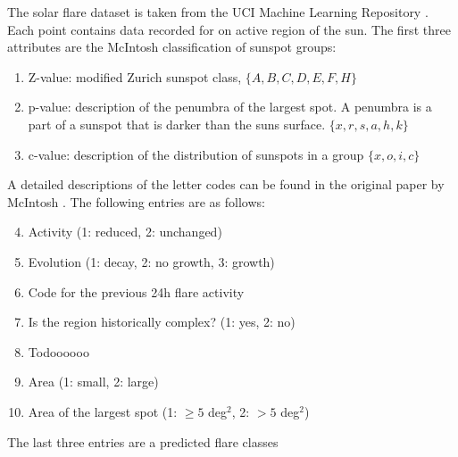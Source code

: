 The solar flare dataset is taken from the UCI Machine Learning Repository \cite{Dua2019}. Each point contains data recorded for on active region of the sun.
The first three attributes are the McIntosh classification of sunspot groups:
\begin{enumerate}
    \item Z-value: modified Zurich sunspot class, $\{A, B, C, D, E, F, H\}$
    \item p-value: description of the penumbra of the largest spot. A penumbra is a part of a sunspot that is darker than the suns surface. $\{x, r, s, a, h, k\}$
    \item c-value: description of the distribution of sunspots in a group $\{x, o, i, c\}$
\end{enumerate}
A detailed descriptions of the letter codes can be found in the original paper by McIntosh \cite{McIntosh1990}.
The following entries are as follows:
\begin{enumerate}
    \setcounter{enumi}{3}
    \item Activity (1: reduced, 2: unchanged)
    \item Evolution (1: decay, 2: no growth, 3: growth)
    \item Code for the previous 24h flare activity
    \item Is the region historically complex? (1: yes, 2: no)
    \item Todoooooo
    \item Area (1: small, 2: large)
    \item Area of the largest spot (1: $\geq 5$ deg$^2$, 2: $>5$ deg$^2$)
\end{enumerate}
The last three entries are a predicted flare classes 